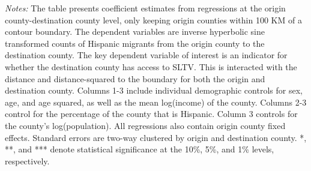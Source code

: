 \begin{table}[!h]
{\begin{threeparttable}
\begin{tablenotes}[flushleft]
				\item \textit{Notes:} The table presents coefficient estimates from regressions at the origin county-destination county level, only keeping origin counties within 100 KM of a contour boundary. The dependent variables are inverse hyperbolic sine transformed counts of Hispanic migrants from the origin county to the destination county. The key dependent variable of interest is an indicator for whether the destination county has access to SLTV. This is interacted with the distance and distance-squared to the boundary for both the origin and destination county. Columns 1-3 include individual demographic controls for sex, age, and age squared, as well as the mean log(income) of the county. Columns 2-3 control for the percentage of the county that is Hispanic. Column 3 controls for the county's log(population). All regressions also contain origin county fixed effects. Standard errors are two-way clustered by origin and destination county. *, **, and *** denote statistical significance at the 10\%, 5\%, and 1\% levels, respectively.
			\end{tablenotes}
		\end{threeparttable}
	}
\end{table}